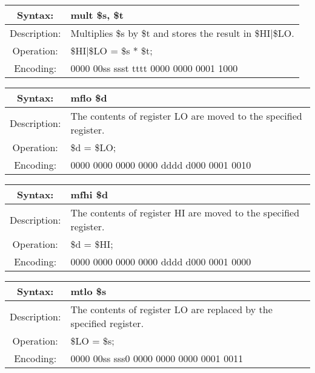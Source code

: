     \begin{table}[!hbp]
    \begin{tabularx}{\textwidth}{|c|X|}
        \hline
        Syntax: & mult \$s, \$t \\
        \hline
        Description: & Multiplies \$s by \$t and stores the result in \$HI|\$LO. \\
        \hline
        Operation: & \$HI|\$LO = \$s * \$t; \\
        \hline
        Encoding: & 0000 00ss ssst tttt 0000 0000 0001 1000 \\
        \hline
    \end{tabularx}
    \end{table}

    \begin{table}[!hbp]
    \begin{tabularx}{\textwidth}{|c|X|}
        \hline
        Syntax: & mflo \$d \\
        \hline
        Description: & The contents of register LO are moved to the specified register. \\
        \hline
        Operation: & \$d = \$LO; \\
        \hline
        Encoding: & 0000 0000 0000 0000 dddd d000 0001 0010 \\
        \hline
    \end{tabularx}
    \end{table}

    \begin{table}[!hbp]
    \begin{tabularx}{\textwidth}{|c|X|}
        \hline
        Syntax: & mfhi \$d \\
        \hline
        Description: & The contents of register HI are moved to the specified register. \\
        \hline
        Operation: & \$d = \$HI; \\
        \hline
        Encoding: & 0000 0000 0000 0000 dddd d000 0001 0000 \\
        \hline
    \end{tabularx}
    \end{table}

    \begin{table}[!hbp]
    \begin{tabularx}{\textwidth}{|c|X|}
        \hline
        Syntax: & mtlo \$s \\
        \hline
        Description: & The contents of register LO are replaced by the specified register. \\
        \hline
        Operation: & \$LO = \$s; \\
        \hline
        Encoding: & 0000 00ss sss0 0000 0000 0000 0001 0011 \\
        \hline
    \end{tabularx}
    \end{table}

